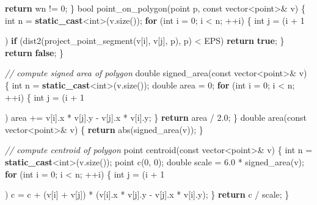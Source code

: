 \documentclass[10pt,]{article}
\newenvironment{Shaded}{}{}
\newcommand{\KeywordTok}[1]{\textcolor[rgb]{0.00,0.44,0.13}{\textbf{{#1}}}}
\newcommand{\DataTypeTok}[1]{\textcolor[rgb]{0.56,0.13,0.00}{{#1}}}
\newcommand{\DecValTok}[1]{\textcolor[rgb]{0.25,0.63,0.44}{{#1}}}
\newcommand{\FloatTok}[1]{\textcolor[rgb]{0.25,0.63,0.44}{{#1}}}
\newcommand{\CommentTok}[1]{\textcolor[rgb]{0.38,0.63,0.69}{\textit{{#1}}}}
\newcommand{\NormalTok}[1]{{#1}}
\begin{document}
\begin{Shaded}
\begin{Highlighting}[]
{    \KeywordTok{return} \NormalTok{wn != }\DecValTok{0}\NormalTok{;}
\NormalTok{\}}
\DataTypeTok{bool} \NormalTok{point_on_polygon(point p, }\DataTypeTok{const} \NormalTok{vector<point>& v) \{}
    \DataTypeTok{int} \NormalTok{n = }\KeywordTok{static_cast}\NormalTok{<}\DataTypeTok{int}\NormalTok{>(v.size());}
    \KeywordTok{for} \NormalTok{(}\DataTypeTok{int} \NormalTok{i = }\DecValTok{0}\NormalTok{; i < n; ++i) \{}
        \DataTypeTok{int} \NormalTok{j = (i + }\DecValTok{1}\NormalTok{) % n;}
        \KeywordTok{if} \NormalTok{(dist2(project_point_segment(v[i], v[j], p), p) < EPS)}
            \KeywordTok{return} \KeywordTok{true}\NormalTok{;}
    \NormalTok{\}}
    \KeywordTok{return} \KeywordTok{false}\NormalTok{;}
\NormalTok{\}}

\CommentTok{// compute signed area of polygon}
\DataTypeTok{double} \NormalTok{signed_area(}\DataTypeTok{const} \NormalTok{vector<point>& v) \{}
    \DataTypeTok{int} \NormalTok{n = }\KeywordTok{static_cast}\NormalTok{<}\DataTypeTok{int}\NormalTok{>(v.size());}
    \DataTypeTok{double} \NormalTok{area = }\DecValTok{0}\NormalTok{;}
    \KeywordTok{for} \NormalTok{(}\DataTypeTok{int} \NormalTok{i = }\DecValTok{0}\NormalTok{; i < n; ++i) \{}
        \DataTypeTok{int} \NormalTok{j = (i + }\DecValTok{1}\NormalTok{) % n;}
        \NormalTok{area += v[i].x * v[j].y - v[j].x * v[i].y;}
    \NormalTok{\}}
    \KeywordTok{return} \NormalTok{area / }\FloatTok{2.0}\NormalTok{;}
\NormalTok{\}}
\DataTypeTok{double} \NormalTok{area(}\DataTypeTok{const} \NormalTok{vector<point>& v) \{}
    \KeywordTok{return} \NormalTok{abs(signed_area(v));}
\NormalTok{\}}

\CommentTok{// compute centroid of polygon}
\NormalTok{point centroid(}\DataTypeTok{const} \NormalTok{vector<point>& v) \{}
    \DataTypeTok{int} \NormalTok{n = }\KeywordTok{static_cast}\NormalTok{<}\DataTypeTok{int}\NormalTok{>(v.size());}
    \NormalTok{point c(}\DecValTok{0}\NormalTok{, }\DecValTok{0}\NormalTok{);}
    \DataTypeTok{double} \NormalTok{scale = }\FloatTok{6.0} \NormalTok{* signed_area(v);}
    \KeywordTok{for} \NormalTok{(}\DataTypeTok{int} \NormalTok{i = }\DecValTok{0}\NormalTok{; i < n; ++i) \{}
        \DataTypeTok{int} \NormalTok{j = (i + }\DecValTok{1}\NormalTok{) % n;}
        \NormalTok{c = c + (v[i] + v[j]) * (v[i].x * v[j].y - v[j].x * v[i].y);}
    \NormalTok{\}}
    \KeywordTok{return} \NormalTok{c / scale;}
\NormalTok{\}}

}}}}
\end{Highlighting}
\end{Shaded}
\end{document}
